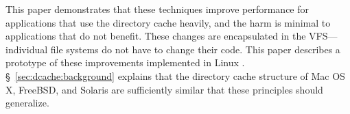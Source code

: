 This paper demonstrates that these techniques improve performance for applications that use the directory cache heavily,
and the harm is minimal to applications that do not benefit.
These changes are encapsulated in the VFS---individual file systems do not have to change their code.
This paper describes a  prototype of these improvements implemented in Linux \linuxver{}.
\S~\ref{sec:dcache:background} explains that the directory cache structure of Mac OS X, FreeBSD, and Solaris 
are sufficiently similar that these principles should generalize.






